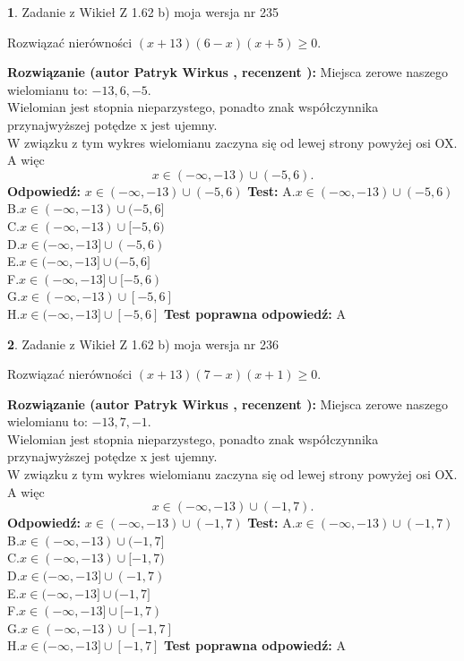 \documentclass[12pt, a4paper]{article}
\theoremstyle{definition} %
\newtheorem{zad}{}
\newcommand{\zadStart}[1]{\begin{zad}#1\newline}
\newcommand{\zadStop}{\end{zad}}
\newcommand{\rozwStart}[2]{\noindent \textbf{Rozwiązanie (autor #1 , recenzent #2): }\newline}
\newcommand{\rozwStop}{\newline}
\newcommand{\odpStart}{\noindent \textbf{Odpowiedź:}\newline}
\newcommand{\odpStop}{\newline}
\newcommand{\testStart}{\noindent \textbf{Test:}\newline}
\newcommand{\testStop}{\newline}
\newcommand{\kluczStart}{\noindent \textbf{Test poprawna odpowiedź:}\newline}
\newcommand{\kluczStop}{\newline}
\begin{document}
\zadStart{Zadanie z Wikieł Z 1.62 b) moja wersja nr 235}

Rozwiązać nierówności $(x+13)(6-x)(x+5)\ge0$.
\zadStop
\rozwStart{Patryk Wirkus}{}
Miejsca zerowe naszego wielomianu to: $-13, 6, -5$.\\
Wielomian jest stopnia nieparzystego, ponadto znak współczynnika przy\linebreak najwyższej potędze x jest ujemny.\\ W związku z tym wykres wielomianu zaczyna się od lewej strony powyżej osi OX. A więc $$x \in (-\infty,-13) \cup (-5,6).$$
\rozwStop
\odpStart
$x \in (-\infty,-13) \cup (-5,6)$
\odpStop
\testStart
A.$x \in (-\infty,-13) \cup (-5,6)$\\
B.$x \in (-\infty,-13) \cup (-5,6]$\\
C.$x \in (-\infty,-13) \cup [-5,6)$\\
D.$x \in (-\infty,-13] \cup (-5,6)$\\
E.$x \in (-\infty,-13] \cup (-5,6]$\\
F.$x \in (-\infty,-13] \cup [-5,6)$\\
G.$x \in (-\infty,-13) \cup [-5,6]$\\
H.$x \in (-\infty,-13] \cup [-5,6]$
\testStop
\kluczStart
A
\kluczStop



\zadStart{Zadanie z Wikieł Z 1.62 b) moja wersja nr 236}

Rozwiązać nierówności $(x+13)(7-x)(x+1)\ge0$.
\zadStop
\rozwStart{Patryk Wirkus}{}
Miejsca zerowe naszego wielomianu to: $-13, 7, -1$.\\
Wielomian jest stopnia nieparzystego, ponadto znak współczynnika przy\linebreak najwyższej potędze x jest ujemny.\\ W związku z tym wykres wielomianu zaczyna się od lewej strony powyżej osi OX. A więc $$x \in (-\infty,-13) \cup (-1,7).$$
\rozwStop
\odpStart
$x \in (-\infty,-13) \cup (-1,7)$
\odpStop
\testStart
A.$x \in (-\infty,-13) \cup (-1,7)$\\
B.$x \in (-\infty,-13) \cup (-1,7]$\\
C.$x \in (-\infty,-13) \cup [-1,7)$\\
D.$x \in (-\infty,-13] \cup (-1,7)$\\
E.$x \in (-\infty,-13] \cup (-1,7]$\\
F.$x \in (-\infty,-13] \cup [-1,7)$\\
G.$x \in (-\infty,-13) \cup [-1,7]$\\
H.$x \in (-\infty,-13] \cup [-1,7]$
\testStop
\kluczStart
A
\kluczStop
\end{document}
